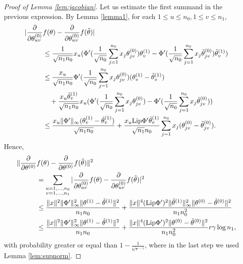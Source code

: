 \documentclass{article}
\theoremstyle{definition}
\theoremstyle{remark}
\numberwithin{equation}{section}
\newcommand{\norm}[2]{
    \|#1\|_{#2}
}
\newcommand{\partv}[1]{
    \frac{\partial}{\partial #1}
}
\begin{document}
\begin{proof}[Proof of Lemma \ref{lem:jacobian}]
    Let us estimate the first summand in the previous expression.
    By Lemma \ref{lemma1}, for each $1 \le u \le n_0, 1 \le v \le n_1$,
    \begin{align}
        \vert \partv{\theta^{(0)}_{uv}} &f(\theta )-\partv{\theta^{(0)}_{uv}} f(\tilde \theta) \vert \\
        &\le \frac{1}{\sqrt{n_1n_0}}x_u(\Phi'(\frac{1}{\sqrt{n_0}}\sum_{j=1}^{n_0}x_j\theta^{(0)}_{jv})\theta^{(1)}_v-\Phi'(\frac{1}{\sqrt{n_0}}\sum_{j=1}^{n_0}x_j\tilde \theta^{(0)}_{jv})\tilde\theta^{(1)}_v)\\
        &\le \frac{x_u}{\sqrt{n_1n_0}}\Phi'(\frac{1}{\sqrt{n_0}}\sum_{j=1}^{n_0}x_j\theta^{(0)}_{jv})(\theta^{(1)}_v - \tilde \theta^{(1)}_v)\\
        &\quad + \frac{x_u\tilde \theta^{(1)}_v}{\sqrt{n_1n_0}}x_u(\Phi'(\frac{1}{\sqrt{n_0}}\sum_{j=1}^{n_0}x_j\theta^{(0)}_{jv})-\Phi'(\frac{1}{\sqrt{n_0}}\sum_{j=1}^{n_0}x_j\tilde \theta^{(0)}_{jv}))\\
        &\le \frac{x_u\norm{\Phi'}{\infty}(\theta^{(1)}_v-\tilde \theta^{(1)}_v)}{\sqrt{n_1n_0}} + \frac{x_u\textup{Lip}\Phi'\tilde \theta^{(1)}_v}{\sqrt{n_1}n_0}\sum_{j=1}^{n_0}x_j(\theta^{(0)}_{jv}-\tilde\theta^{(0)}_{jv}).
    \end{align}
    Hence,
    \begin{align}
        \norm{\partv{\theta^{(0)}} &f(\theta )-\partv{\theta^{(0)}} f(\tilde \theta)}{}^2 \\
        &= \sum_{\substack{u=1, \ldots, n_0 \\v=1, \ldots, n_1}}\vert \partv{\theta^{(0)}_{uv}} f(\theta )-\partv{\theta^{(0)}_{uv}} f(\tilde \theta) \vert^2 \\
        &\le \frac{\norm{x}{}^2\norm{\Phi'}{\infty}^2\norm{\theta^{(1)}-\tilde \theta^{(1)}}{}^2}{n_1n_0} + \frac{\norm{x}{}^4(\textup{Lip}\Phi')^2\norm{\tilde \theta^{(1)}}{\infty}^2\norm{\theta^{(0)}-\tilde \theta^{(0)}}{}^2}{n_1n_0^2}\\
        &\le \frac{\norm{x}{}^2\norm{\Phi'}{\infty}^2\norm{\theta^{(1)}-\tilde \theta^{(1)}}{}^2}{n_1n_0} + \frac{\norm{x}{}^4(\textup{Lip}\Phi')^2\norm{\theta^{(0)}-\tilde \theta^{(0)}}{}^2}{n_1n_0^2}r\gamma\log n_1,
    \end{align}
    with probability greater or equal than $1-\frac{1}{n^{\frac{r\gamma}{2}-1}}$, where in the last step we used Lemma \ref{lem:supnorm}.


\end{proof}
\end{document}
